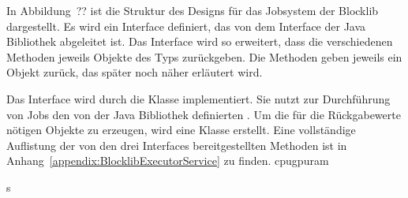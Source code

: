 \documentclass[12pt,a4paper,listof=totocnumbered,parskip=half]{scrartcl}
\begin{document}
In Abbildung~?? ist die Struktur des Designs für das Jobsystem der Blocklib dargestellt. Es wird ein Interface  definiert, das von dem Interface  der Java Bibliothek abgeleitet ist. Das Interface wird so erweitert, dass die verschiedenen  Methoden jeweils Objekte des Typs  zurückgeben. Die  Methoden geben jeweils ein  Objekt zurück, das später noch näher erläutert wird.

Das Interface  wird durch die Klasse  implementiert. Sie nutzt zur Durchführung von Jobs den von der Java Bibliothek definierten . Um die für die Rückgabewerte nötigen  Objekte zu erzeugen, wird eine Klasse  erstellt. Eine vollständige Auflistung der von den drei Interfaces bereitgestellten Methoden ist in Anhang~\vref{appendix:BlocklibExecutorService} zu finden. 
\pgfplotsset{
	height=4cm,
}
\si[]{\fps}\ac{cpu}\ac{gpu}\ac{ram}\\


\clearpage
\pgfplotsset{
	height=2cm,
	
}
\settowidth{}
s\\
	\\
	\\
	\\
	\\
	\\
	\\
\end{document}

